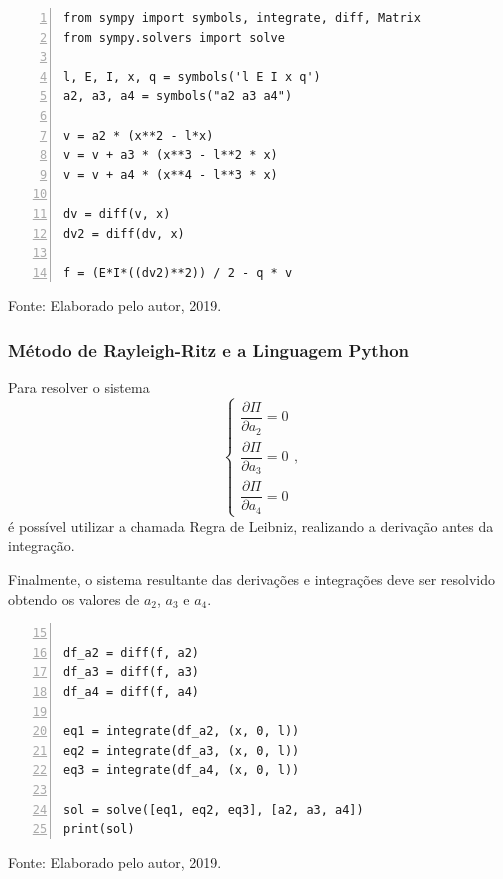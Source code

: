 \documentclass{beamer}
\begin{document}
	\begin{frame}[containsverbatim]
		\begin{lstlisting}[style=Python,numbers=left, caption={Definição da Função Aproximada e Integrando}, captionpos=t]
from sympy import symbols, integrate, diff, Matrix
from sympy.solvers import solve

l, E, I, x, q = symbols('l E I x q')
a2, a3, a4 = symbols("a2 a3 a4")

v = a2 * (x**2 - l*x) 
v = v + a3 * (x**3 - l**2 * x)
v = v + a4 * (x**4 - l**3 * x)

dv = diff(v, x)
dv2 = diff(dv, x)

f = (E*I*((dv2)**2)) / 2 - q * v
		\end{lstlisting}
		\begin{center}
			\footnotesize Fonte: Elaborado pelo autor, 2019.
		\end{center}
	\end{frame}
	
	\begin{frame}
		\frametitle{Método de Rayleigh-Ritz e a Linguagem Python}
		\justify
		
		Para resolver o sistema
		$$
			\begin{cases}
				\dfrac{\partial \Pi}{\partial a_2}=0\\[10pt]
				\dfrac{\partial \Pi}{\partial a_3}=0\\[10pt]
				\dfrac{\partial \Pi}{\partial a_4}=0
			\end{cases}
			\text{,}
		$$
		é possível utilizar a chamada Regra de Leibniz, realizando a derivação antes da integração.
		\vspace{10pt}
		\pause
		
		Finalmente, o sistema resultante das derivações e integrações deve ser resolvido obtendo os valores de $a_2$, $a_3$ e $a_4$.
	\end{frame}
	
	\begin{frame}[containsverbatim]
		\begin{lstlisting}[style=Python, numbers=left, firstnumber=15, caption={Definição da Função Aproximada e Integrando}, captionpos=t]

df_a2 = diff(f, a2)
df_a3 = diff(f, a3)
df_a4 = diff(f, a4)

eq1 = integrate(df_a2, (x, 0, l))
eq2 = integrate(df_a3, (x, 0, l))
eq3 = integrate(df_a4, (x, 0, l))

sol = solve([eq1, eq2, eq3], [a2, a3, a4])
print(sol)
		\end{lstlisting}
		\begin{center}
			\footnotesize Fonte: Elaborado pelo autor, 2019.
		\end{center}
	\end{frame}
	
\end{document}
